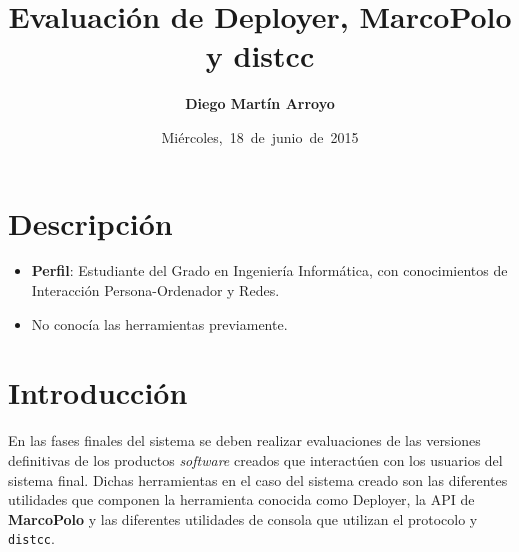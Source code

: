 
\usepackage{xcolor}

\newcommand{\hmwkTitle}{Evaluación de Deployer, MarcoPolo y distcc} %
\newcommand{\hmwkDueDate}{Miércoles,\ 18\ de\ junio\ de\ 2015}
\newcommand{\hmwkClassInstructor}{Rodrigo Santamaría} %
\newcommand{\hmwkAuthorName}{Diego Martín Arroyo} %
\newcommand{\hmwkSubject}{5} %

\newcommand{\ordinalindicator}{\hspace{-1.5mm}$\phantom{a}^{\circ}$}
\title{\hmwkTitle}
\author{\textbf{\hmwkAuthorName}}
\date{\hmwkDueDate}


\maketitle

\tableofcontents


\section{Descripción}

\begin{itemize}
 	\item \textbf{Perfil}: Estudiante del Grado en Ingeniería Informática, con conocimientos de Interacción Persona-Ordenador y Redes.
 	\item No conocía las herramientas previamente.
\end{itemize}


\section{Introducción}

En las fases finales del sistema se deben realizar evaluaciones de las versiones definitivas de los productos \textit{software} creados que interactúen con los usuarios del sistema final. Dichas herramientas en el caso del sistema creado son las diferentes utilidades que componen la herramienta conocida como Deployer, la API de \textbf{MarcoPolo} y las diferentes utilidades de consola que utilizan el protocolo y \texttt{distcc}.

